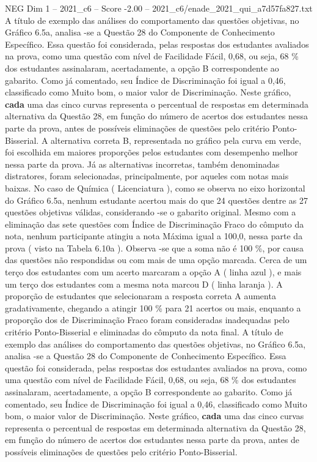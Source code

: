\begin{textsample}{NEG Dim 1 – 2021\_c6 – Score -2.00 – 2021\_c6/enade\_2021\_qui\_a7d57fa827.txt}
A título de exemplo das análises do comportamento das questões objetivas, no Gráfico 6.5a, analisa -se a Questão 28 do Componente de Conhecimento Específico.
Essa questão foi considerada, pelas respostas dos estudantes avaliados na prova, como uma questão com nível de Facilidade Fácil, 0,68, ou seja, 68 \% dos estudantes assinalaram, acertadamente, a opção B correspondente ao gabarito.
Como já comentado, seu Índice de Discriminação foi igual a 0,46, classificado como Muito bom, o maior valor de Discriminação.
Neste gráfico, \textbf{cada} uma das cinco curvas representa o percentual de respostas em determinada alternativa da Questão 28, em função do número de acertos dos estudantes nessa parte da prova, antes de possíveis eliminações de questões pelo critério Ponto-Bisserial.
A alternativa correta B, representada no gráfico pela curva em verde, foi escolhida em maiores proporções pelos estudantes com desempenho melhor nessa parte da prova.
Já as alternativas incorretas, também denominadas distratores, foram selecionadas, principalmente, por aqueles com notas mais baixas.
No caso de Química ( Licenciatura ), como se observa no eixo horizontal do Gráfico 6.5a, nenhum estudante acertou mais do que 24 questões dentre as 27 questões objetivas válidas, considerando -se o gabarito original.
Mesmo com a eliminação das sete questões com Índice de Discriminação Fraco do cômputo da nota, nenhum participante atingiu a nota Máxima igual a 100,0, nessa parte da prova ( visto na Tabela 6.10a ).
Observa -se que a soma não é 100 \%, por causa das questões não respondidas ou com mais de uma opção marcada.
Cerca de um terço dos estudantes com um acerto marcaram a opção A ( linha azul ), e mais um terço dos estudantes com a mesma nota marcou D ( linha laranja ).
A proporção de estudantes que selecionaram a resposta correta A aumenta gradativamente, chegando a atingir 100 \% para 21 acertos ou mais, enquanto a proporção dos de Discriminação Fraco foram consideradas inadequadas pelo critério Ponto-Bisserial e eliminadas do cômputo da nota final.
A título de exemplo das análises do comportamento das questões objetivas, no Gráfico 6.5a, analisa -se a Questão 28 do Componente de Conhecimento Específico.
Essa questão foi considerada, pelas respostas dos estudantes avaliados na prova, como uma questão com nível de Facilidade Fácil, 0,68, ou seja, 68 \% dos estudantes assinalaram, acertadamente, a opção B correspondente ao gabarito.
Como já comentado, seu Índice de Discriminação foi igual a 0,46, classificado como Muito bom, o maior valor de Discriminação.
Neste gráfico, \textbf{cada} uma das cinco curvas representa o percentual de respostas em determinada alternativa da Questão 28, em função do número de acertos dos estudantes nessa parte da prova, antes de possíveis eliminações de questões pelo critério Ponto-Bisserial.

\end{textsample}
